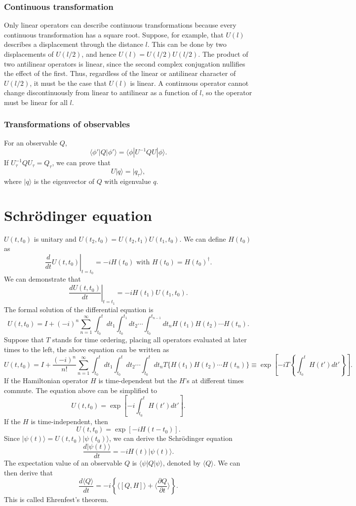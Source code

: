 \subsubsection{Continuous transformation} 
Only linear operators can describe continuous transformations because every continuous transformation has a square root. Suppose, for example, that $U(l)$ describes a displacement through the distance $l$. This can be done by two displacements of $U(l/2)$, and hence $U(l) = U(l/2) U(l/2)$. The product of two antilinear operators is linear, since the second complex conjugation nullifies the effect of the first. Thus, regardless of the linear or antilinear character of $U(l/2)$, it must be the case that $U(l)$ is linear. A continuous operator cannot change discontinuously from linear to antilinear as a function of $l$, so the operator must be linear for all $l$.

\subsubsection{Transformations of observables}
\noindent
For an observable $Q$, 
\[\langle \phi' | Q | \phi' \rangle = \langle \phi | U^{-1}QU | \phi \rangle .\]
If $U_{\tau}^{-1}QU_{\tau} = Q_{\tau}$, we can prove that
\[U|q\rangle = | q_{\tau}\rangle,\]
where $|q\rangle$ is the eigenvector of $Q$ with eigenvalue $q$.


\section{Schr\"{o}dinger equation}
\noindent
$U(t,t_0)$ is unitary and $U(t_2,t_0) = U(t_2,t_1)U(t_1,t_0)$. We can define $H(t_0)$ as
\[\left. \frac{d}{dt}U(t,t_0)\right|_{t=t_0} = -iH(t_0) \mbox{ with } H(t_0) = H(t_0)^{\dagger}.\]
We can demonstrate that
\[\left. \frac{dU(t,t_0)}{dt}\right|_{t=t_1} = -iH(t_1)U(t_1,t_0) .\]
The formal solution of the differential equation is
\[U(t,t_0) = I + (-i)^n \sum_{n=1}^{\infty} \int_{t_0}^{t}dt_1 \int_{t_0}^{t_1}dt_2 \cdots \int_{t_0}^{t_{n-1}} dt_n H(t_1)H(t_2)\cdots H(t_n).\]
Suppose that $T$ stands for time ordering, placing all operators evaluated at later times to the left, the above equation can be written as
\[U(t,t_0) = I + \frac{(-i)^n}{n!} \sum_{n=1}^{\infty} \int_{t_0}^{t}dt_1 \int_{t_0}^{t}dt_2 \cdots \int_{t_0}^{t} dt_n T\{H(t_1)H(t_2)\cdots H(t_n)\} \equiv \exp \left[ -i T\left\{ \int_{t_0}^{t} H(t')dt'\right\} \right] .\]
If the Hamiltonian operator $H$ is time-dependent but the $H$'s at different times commute. The equation above can be simplified to
\[U(t,t_0) = \exp \left[ -i \int_{t_0}^{t} H(t')dt' \right] .\]
If the $H$ is time-independent, then
\[U(t,t_0) = \exp \left[ -i H(t-t_0) \right] .\]
Since $|\psi(t)\rangle = U(t,t_0) |\psi(t_0)\rangle$, we can derive the Schr\"{o}dinger equation
\[\frac{d |\psi(t)\rangle}{dt} = -iH(t) |\psi(t)\rangle.\]
The expectation value of an observable $Q$ is $\langle \psi | Q | \psi \rangle$, denoted by $\langle Q \rangle$. We can then derive that
\[\frac{d\langle Q \rangle}{dt} = -i \left\{ \langle [Q,H] \rangle + \langle \frac{\partial Q}{\partial t} \rangle \right\}.\]
This is called Ehrenfest's theorem. 

